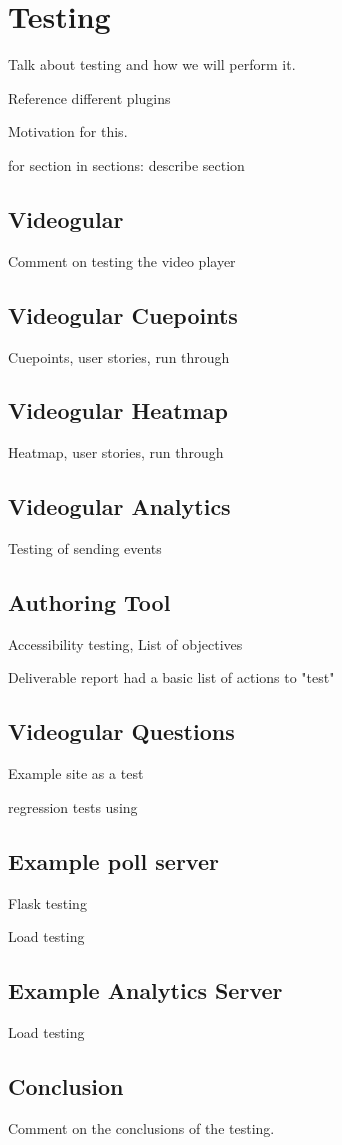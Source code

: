 \chapter{Testing} \label{Chapter: Testing}

Talk about testing and how we will perform it.

Reference different plugins

Motivation for this.

{for section in sections: describe section}

\section{Videogular}

Comment on testing the video player

\section{Videogular Cuepoints}

Cuepoints, user stories, run through

\section{Videogular Heatmap}

Heatmap, user stories, run through

\section{Videogular Analytics}

Testing of sending events

\section{Authoring Tool}

Accessibility testing, List of objectives

Deliverable report had a basic list of actions to "test"

\section{Videogular Questions}

Example site as a test

regression tests using 

\section{Example poll server}

Flask testing

Load testing

\section{Example Analytics Server}

Load testing

\section{Conclusion}

Comment on the conclusions of the testing.

